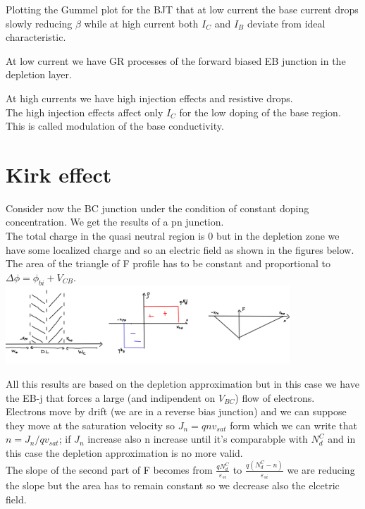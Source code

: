 Plotting the Gummel plot for the BJT that at low current the base current drops slowly reducing $\beta$ while at high current both $I_C$ and $I_B$ deviate from ideal characteristic.\\

\vspace{3mm}

At low current we have GR processes of the forward biased EB junction in the depletion layer.

\vspace{3mm}

At high currents we have high injection effects and resistive drops.\\
The high injection effects affect only $I_C$ for the low doping of the base region. This is called modulation of the base conductivity.\\

\section{Kirk effect}
Consider now the BC junction under the condition of constant doping concentration. We get the results of a pn junction.\\
The total charge in the quasi neutral region is 0 but in the depletion zone we have some localized charge and so an electric field as shown in the figures below.\\
The area of the triangle of F profile has to be constant and proportional to $\Delta \phi=\phi_{bi}+V_{CB}$.\\

\centering
\includegraphics[width=0.8\textwidth]{bjt9.png}\\
\raggedright

All this results are based on the depletion approximation but in this case we have the EB-j that forces a large (and indipendent on $V_{BC}$) flow of electrons.\\
Electrons move by drift (we are in a reverse bias junction) and we can suppose they move at the saturation velocity so $J_n=qnv_{sat}$ form which we can write that $n=J_n/qv_{sat}$; if $J_n$ increase also n increase until it's comparabple with $N_d^C$ and in this case the depletion approximation is no more valid.\\
The slope of the second part of F becomes from $\frac{qN_d^C}{\varepsilon_{si}}$ to $\frac{q(N_d^C-n)}{\varepsilon_{si}}$ we are reducing the slope but the area has to remain constant so we decrease also the elcetric field.\\

